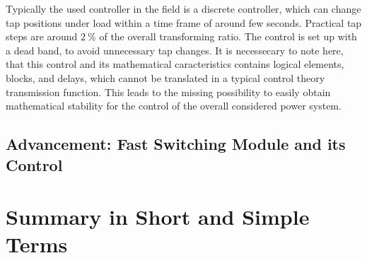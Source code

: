 Typically the used controller in the field is a discrete controller, which can change tap positions under load within a time frame of around few seconds. 
Practical tap steps are around $2~\mathrm{\%}$ of the overall transforming ratio. 
The control is set up with a dead band, to avoid unnecessary tap changes. 
It is necessecary to note here, that this control and its mathematical caracteristics contains logical elements, blocks, and delays, which cannot be translated in a typical control theory transmission function. 
This leads to the missing possibility to easily obtain mathematical stability for the control of the overall considered power system. \quelle

\subsection{Advancement: Fast Switching Module and its Control}



\section{Summary in Short and Simple Terms}

